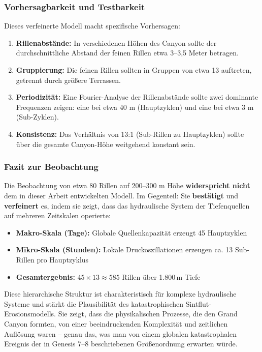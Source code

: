 \subsubsection{Vorhersagbarkeit und Testbarkeit}

Dieses verfeinerte Modell macht spezifische Vorhersagen:

\begin{enumerate}
	\item \textbf{Rillenabstände:} In verschiedenen Höhen des Canyon sollte der durchschnittliche Abstand der feinen Rillen etwa 3--3,5 Meter betragen.
	
	\item \textbf{Gruppierung:} Die feinen Rillen sollten in Gruppen von etwa 13 auftreten, getrennt durch größere Terrassen.
	
	\item \textbf{Periodizität:} Eine Fourier-Analyse der Rillenabstände sollte zwei dominante Frequenzen zeigen: eine bei etwa 40 m (Hauptzyklen) und eine bei etwa 3 m (Sub-Zyklen).
	
	\item \textbf{Konsistenz:} Das Verhältnis von 13:1 (Sub-Rillen zu Hauptzyklen) sollte über die gesamte Canyon-Höhe weitgehend konstant sein.
\end{enumerate}

\subsubsection{Fazit zur Beobachtung}

Die Beobachtung von etwa 80 Rillen auf 200--300 m Höhe \textbf{widerspricht nicht} dem in dieser Arbeit entwickelten Modell. Im Gegenteil: Sie \textbf{bestätigt} und \textbf{verfeinert} es, indem sie zeigt, dass das hydraulische System der Tiefenquellen auf mehreren Zeitskalen operierte:

\begin{itemize}
	\item \textbf{Makro-Skala (Tage):} Globale Quellenkapazität erzeugt 45 Hauptzyklen
	\item \textbf{Mikro-Skala (Stunden):} Lokale Druckoszillationen erzeugen ca. 13 Sub-Rillen pro Hauptzyklus
	\item \textbf{Gesamtergebnis:} $45 \times 13 \approx 585$ Rillen über 1.800\,m Tiefe
\end{itemize}

Diese hierarchische Struktur ist charakteristisch für komplexe hydraulische Systeme und stärkt die Plausibilität des katastrophischen Sintflut-Erosionsmodells. Sie zeigt, dass die physikalischen Prozesse, die den Grand Canyon formten, von einer beeindruckenden Komplexität und zeitlichen Auflösung waren -- genau das, was man von einem globalen katastrophalen Ereignis der in Genesis 7--8 beschriebenen Größenordnung erwarten würde.

